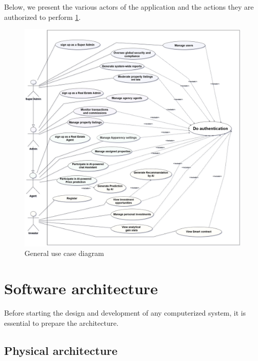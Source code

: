 Below, we present the various actors of the application and the actions they are authorized to perform \ref{fig:use-case-diagram}.
\begin{figure}[htbp]
    \centering
    \includegraphics[width=1.03\textwidth]{images/diagram de case d utilisation general.png}
    \caption{General use case diagram}
    \label{fig:use-case-diagram}
\end{figure}
\section{Software architecture}

Before starting the design and development of any computerized system, it is essential to prepare the architecture.

\subsection{Physical architecture}

